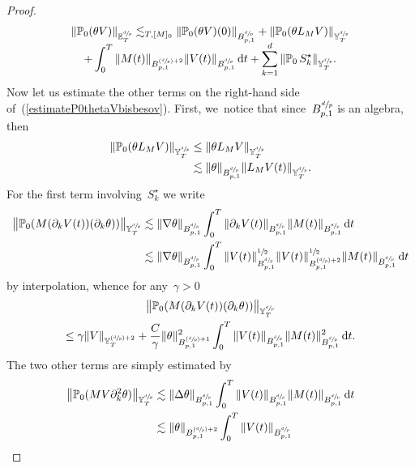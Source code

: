 \documentclass[JEP,XML,SOM,Unicode,published]{cedram}
\newcommand{\Psfrac}[2]{(\sfrac{#1}{#2})}
\theoremstyle{definition}
\newcommand\dd{\mathrm{d}}
\begin{document}
\begin{proof}
\begin{multline}\label{estimateP0thetaVbisbesov}
\|\mathbb{P}_0(\theta V)\|_{{\mathbb E}^{\sfrac dp}_T} \lesssim_{T,[M]_0} \|\mathbb{P}_0(\theta V)(0)\|_{B^{\sfrac dp}_{p,1}}
+ \| \mathbb{P}_0(\theta L_{M }V)\|_{{\mathbb Y}^{\sfrac dp}_T} \\[-5pt]
+ \int_0^T
\| M(t)\|_{ B^{\Psfrac dp+2}_{p,1}} \|V(t)\|_{ B^{\sfrac dp}_{p,1}}\, \dd t+ \sum_{k=1}^d \|\mathbb{P}_0\,S_k^\star\|_{{\mathbb Y}^{\sfrac dp}_T}.
\end{multline}
Now let us estimate the other terms on the right-hand side of~(\ref{estimateP0thetaVbisbesov}). First, we~notice that since~$B^{\sfrac dp}_{p,1}$ is an algebra, then
\[
\begin{aligned}
\| \mathbb{P}_0(\theta L_{M }V)\| _{{\mathbb Y}^{\sfrac dp}_T} & \leq \| \theta L_{M }V\| _{{\mathbb Y}^{\sfrac dp}_T} \\
&\lesssim \|\theta \|_{ B^{\sfrac dp}_{p,1}} \| L_{M }V(t) \| _{{\mathbb Y}^{\sfrac dp}_T}.
\end{aligned}
\]
For the first term involving~$S^\star_k$ we write
\[
\begin{aligned}
\big \| \mathbb{P}_0(M (\partial_k V(t))(\partial_k\theta)) \big\|_{ {\mathbb Y}^{\sfrac dp}_T } & \lesssim \|\nabla \theta\|_{ B^{\sfrac dp}_{p,1} } \int_0^T \| \partial_k V(t)\|_{B^{\sfrac dp}_{p,1}}
\|M(t)\| _{ B^{\sfrac dp}_{p,1}} \, \dd t \\
& \lesssim \|\nabla \theta\|_{ B^{\sfrac dp}_{p,1} } \int_0^T \| V(t)\|_{B^{\sfrac dp}_{p,1}}^{\sfrac12} \| V(t)\|_{B^{\Psfrac dp+2}_{p,1}}^{\sfrac12}
\|M(t)\| _{ B^{\sfrac dp}_{p,1}} \, \dd t
\end{aligned}
\]
by interpolation, whence for any~$
\gamma>0$
\begin{multline*}
\big \| \mathbb{P}_0(M (\partial_k V(t))(\partial_k\theta)) \big\|_{ {\mathbb Y}^{\sfrac dp}_T }\\
\leq \gamma \| V\|_{{\mathbb Y}^{\Psfrac dp+2}_T} + \frac C\gamma \| \theta\|^2_{ B^{\Psfrac dp+1}_{p,1} } \int_0^T \| V(t)\|_{B^{\sfrac dp}_{p,1}}\|M(t)\|^2 _{ B^{\sfrac dp}_{p,1}} \, \dd t.
\end{multline*}
The two other terms are simply estimated by
\[
\begin{aligned}
\big \| \mathbb{P}_0(MV \partial_k^2 \theta) \big\|_{{\mathbb Y}^{\sfrac dp}_T } & \lesssim \|\Delta \theta\|_{ B^{\sfrac dp}_{p,1} } \int_0^T \| V(t)\|_{B^{\sfrac dp}_{p,1}}
\|M(t)\| _{ B^{\sfrac dp}_{p,1}} \, \dd t \\
& \lesssim \| \theta\|_{ B^{\Psfrac dp+2}_{p,1} } \int_0^T \| V(t)\|_{B^{\sfrac dp}_{p,1}}

\end{aligned}\]
\end{proof}
\end{document}
